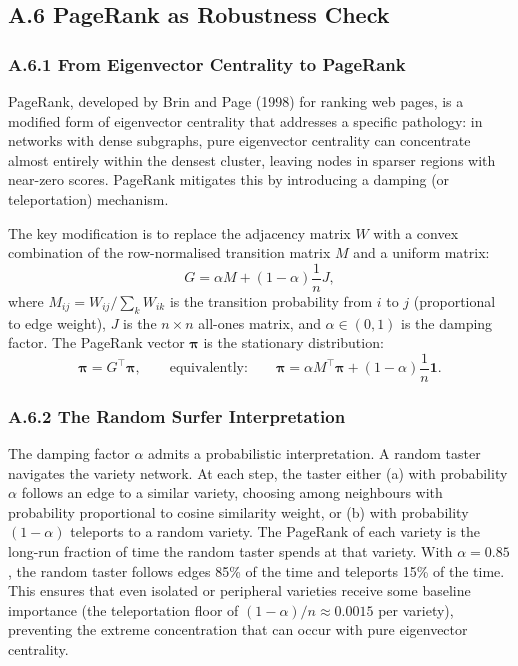\documentclass[11pt]{article}
\begin{document}
\subsection*{A.6 PageRank as Robustness Check}

\subsubsection*{A.6.1 From Eigenvector Centrality to PageRank}
PageRank, developed by Brin and Page (1998) for ranking web pages, is a modified form of eigenvector centrality that addresses a specific pathology: in networks with dense subgraphs, pure eigenvector centrality can concentrate almost entirely within the densest cluster, leaving nodes in sparser regions with near-zero scores. PageRank mitigates this by introducing a damping (or teleportation) mechanism.

The key modification is to replace the adjacency matrix $W$ with a convex combination of the row-normalised transition matrix $M$ and a uniform matrix:
\[
G = \alpha M + (1 - \alpha) \frac{1}{n} J,
\]
where $M_{ij} = W_{ij} / \sum_k W_{ik}$ is the transition probability from $i$ to $j$ (proportional to edge weight), $J$ is the $n \times n$ all-ones matrix, and $\alpha \in (0, 1)$ is the damping factor. The PageRank vector $\boldsymbol\pi$ is the stationary distribution:
\[
\boldsymbol\pi = G^\top \boldsymbol\pi, \qquad \text{equivalently:}\qquad \boldsymbol\pi = \alpha M^\top \boldsymbol\pi + (1 - \alpha)\frac{1}{n}\mathbf{1}.
\]

\subsubsection*{A.6.2 The Random Surfer Interpretation}
The damping factor $\alpha$ admits a probabilistic interpretation. A random taster navigates the variety network. At each step, the taster either (a) with probability $\alpha$ follows an edge to a similar variety, choosing among neighbours with probability proportional to cosine similarity weight, or (b) with probability $(1 - \alpha)$ teleports to a random variety. The PageRank of each variety is the long-run fraction of time the random taster spends at that variety. With $\alpha = 0.85$, the random taster follows edges 85\% of the time and teleports 15\% of the time. This ensures that even isolated or peripheral varieties receive some baseline importance (the teleportation floor of $(1 - \alpha)/n \approx 0.0015$ per variety), preventing the extreme concentration that can occur with pure eigenvector centrality.
\end{document}
